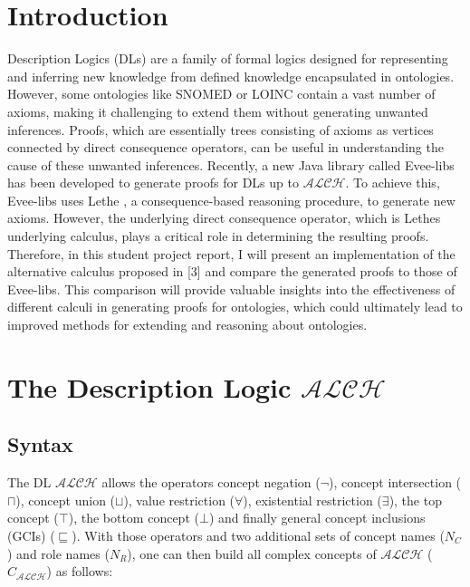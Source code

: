 \documentclass[titlepage]{article}
\begin{document}
\section{Introduction}
Description Logics (DLs) are a family of formal logics designed for representing and inferring new
knowledge from defined knowledge encapsulated in ontologies. However, some ontologies like SNOMED or
LOINC \cite{article}
contain a vast number of axioms, making it challenging to extend them without generating unwanted 
inferences. Proofs, which are essentially trees consisting of axioms as vertices connected by 
direct consequence operators, can be useful in understanding the cause of these unwanted inferences. 
Recently, a new Java library called Evee-libs \cite{https://doi.org/10.48550/arxiv.2206.07711} has been developed to generate proofs for DLs up to 
$\mathcal{ALCH}$. To achieve this, Evee-libs uses Lethe \cite{KoopmannSchmidt15c}, a 
consequence-based reasoning procedure, to generate new axioms. However, the underlying direct 
consequence operator, which is Lethes underlying calculus, 
plays a critical role in determining the resulting proofs. Therefore, in this student project report, 
I will present an implementation of the alternative calculus proposed in [3] and compare the 
generated proofs to those of Evee-libs. This comparison will provide valuable insights into the effectiveness of 
different calculi in generating proofs for ontologies, which could ultimately lead to improved 
methods for extending and reasoning about ontologies.



\section{The Description Logic $\mathcal{ALCH}$}

\subsection{Syntax}
The DL $\mathcal{ALCH}$ allows the operators concept negation ($\neg$), 
concept intersection ($\sqcap$), concept union ($\sqcup$), value restriction
 ($\forall$), existential restriction ($\exists$), the top concept ($\top$),
 the bottom concept ($\bot$) and finally general concept inclusions (GCIs) ($\sqsubseteq$).
With those operators and two additional sets of concept names ($N_C$) and role names ($N_R$),
one can then build all complex concepts of $\mathcal{ALCH}$ 
($C_{\mathcal{ALCH}}$) as follows:
\end{document}
